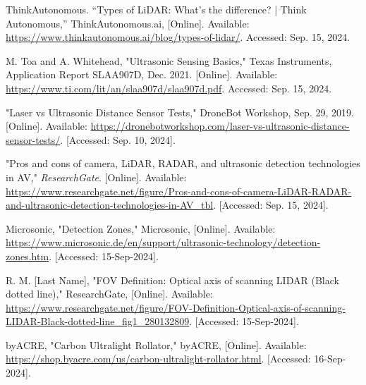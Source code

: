 \begin{thebibliography}{45}
	 ThinkAutonomous. “Types of LiDAR: What's the difference? | Think Autonomous,” ThinkAutonomous.ai, [Online]. Available: \href{https://www.thinkautonomous.ai/blog/types-of-lidar/}{https://www.thinkautonomous.ai/blog/types-of-lidar/}. Accessed: Sep. 15, 2024.
	
	 M. Toa and A. Whitehead, "Ultrasonic Sensing Basics," Texas Instruments, Application Report SLAA907D, Dec. 2021. [Online]. Available: \href{https://www.ti.com/lit/an/slaa907d/slaa907d.pdf}{https://www.ti.com/lit/an/slaa907d/slaa907d.pdf}. Accessed: Sep. 15, 2024.
	
	 "Laser vs Ultrasonic Distance Sensor Tests," DroneBot Workshop, Sep. 29, 2019. [Online]. Available: \href{https://dronebotworkshop.com/laser-vs-ultrasonic-distance-sensor-tests/}{https://dronebotworkshop.com/laser-vs-ultrasonic-distance-sensor-tests/}. [Accessed: Sep. 10, 2024].
	
	 "Pros and cons of camera, LiDAR, RADAR, and ultrasonic detection technologies in AV," \textit{ResearchGate}. [Online]. Available: \href{https://www.researchgate.net/figure/Pros-and-cons-of-camera-LiDAR-RADAR-and-ultrasonic-detection-technologies-in-AV\_tbl}{https://www.researchgate.net/figure/Pros-and-cons-of-camera-LiDAR-RADAR-and-ultrasonic-detection-technologies-in-AV\_tbl}. [Accessed: Sep. 15, 2024].
	
	 Microsonic, "Detection Zones," Microsonic, [Online]. Available: \href{https://www.microsonic.de/en/support/ultrasonic-technology/detection-zones.htm}{https://www.microsonic.de/en/support/ultrasonic-technology/detection-zones.htm}. [Accessed: 15-Sep-2024].
	
	 R. M. [Last Name], "FOV Definition: Optical axis of scanning LIDAR (Black dotted line)," ResearchGate, [Online]. Available: \href{https://www.researchgate.net/figure/FOV-Definition-Optical-axis-of-scanning-LIDAR-Black-dotted-line\_fig1\_280132809}{https://www.researchgate.net/figure/FOV-Definition-Optical-axis-of-scanning-LIDAR-Black-dotted-line\_fig1\_280132809}. [Accessed: 15-Sep-2024].
	
	 byACRE, "Carbon Ultralight Rollator," byACRE, [Online]. Available: \href{https://shop.byacre.com/us/carbon-ultralight-rollator.html}{https://shop.byacre.com/us/carbon-ultralight-rollator.html}. [Accessed: 16-Sep-2024].
	

\end{thebibliography}
